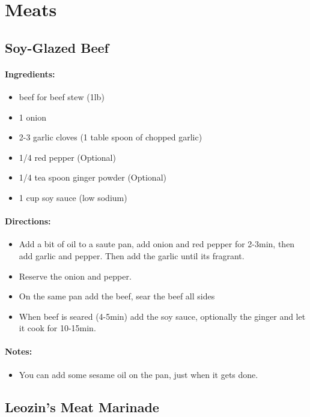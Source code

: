 \documentclass{article}
\begin{document}
\section{Meats}


\subsection{Soy-Glazed Beef}

\paragraph{Ingredients:}
\begin{itemize}
    \item beef for beef stew (1lb)
    \item 1 onion
    \item 2-3 garlic cloves (1 table spoon of chopped garlic)
    \item 1/4 red pepper (Optional)
    \item 1/4 tea spoon ginger powder (Optional)
    \item 1 cup soy sauce (low sodium)
\end{itemize}

\paragraph{Directions:}
\begin{itemize}
    \item Add a bit of oil to a saute pan, add onion and red pepper for 2-3min, then add garlic and pepper. Then add the garlic until its fragrant.
    \item Reserve the onion and pepper.
    \item On the same pan add the beef, sear the beef all sides
    \item When beef is seared (4-5min) add the soy sauce, optionally the ginger and let it cook for 10-15min.
\end{itemize}

\paragraph{Notes:}
\begin{itemize}
    \item You can add some sesame oil on the pan, just when it gets done.
\end{itemize}

\subsection{Leozin’s Meat Marinade}
\end{document}
